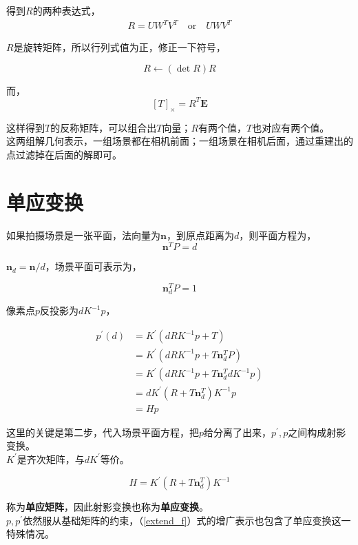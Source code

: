 	得到$R$的两种表达式，
	\begin{align*}
		R = UW^TV^T\quad \text{or}\quad UWV^T
	\end{align*}

	$R$是旋转矩阵，所以行列式值为正，修正一下符号，

	$$
		R \leftarrow (\mathop{det} R)R
	$$

	而，
	$$
		[T]_{\times} = R^T\mathbf{E}
	$$

	这样得到$T$的反称矩阵，可以组合出$T$向量；$R$有两个值，$T$也对应有两个值。\\


	这两组解几何表示，一组场景都在相机前面；一组场景在相机后面，通过重建出的点过滤掉在后面的解即可。

\section{单应变换}

	如果拍摄场景是一张平面，法向量为$\mathbf{n}$，到原点距离为$d$，则平面方程为，
	$$
		\mathbf{n}^T P = d
	$$

	$\mathbf{n}_d = \mathbf{n}/d$，场景平面可表示为，
	
	$$
		\mathbf{n}_d^T P = 1
	$$

	像素点$p$反投影为$dK^{-1}p$，

	\begin{align*}
		p^{\prime}(d) &= K^{\prime}\left(dRK^{-1}p + T\right)\\
		&= K^{\prime}\left(dRK^{-1}p + T\mathbf{n}_d^T P\right)\\
		&= K^{\prime}\left(dRK^{-1}p + T\mathbf{n}_d^TdK^{-1}p\right)\\
		&= dK^{\prime}\left(R + T\mathbf{n}_d^T\right)K^{-1}p\\
		&= Hp
	\end{align*}

	这里的关键是第二步，代入场景平面方程，把$p$给分离了出来，$p^\prime,p$之间构成射影变换。\\

	$K^\prime$是齐次矩阵，与$dK^\prime$等价。

	\begin{equation}
		H= K^{\prime}\left(R + T\mathbf{n}_d^T\right)K^{-1} \label{homograph_matrix}
	\end{equation}

	称为\textbf{单应矩阵}，因此射影变换也称为\textbf{单应变换}。\\

	$p,p^{\prime}$依然服从基础矩阵的约束，（\ref{extend_f}）式的增广表示也包含了单应变换这一特殊情况。\\


